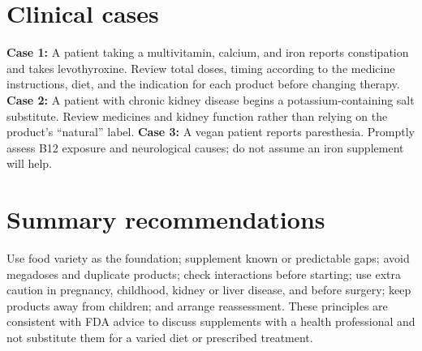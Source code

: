 \section{Clinical cases}
\textbf{Case 1:} A patient taking a multivitamin, calcium, and iron reports constipation and takes levothyroxine. Review total doses, timing according to the medicine instructions, diet, and the indication for each product before changing therapy. \textbf{Case 2:} A patient with chronic kidney disease begins a potassium-containing salt substitute. Review medicines and kidney function rather than relying on the product's ``natural'' label. \textbf{Case 3:} A vegan patient reports paresthesia. Promptly assess B12 exposure and neurological causes; do not assume an iron supplement will help. \cite{odsCa,odsIron,napElectrolytes,odsB12}

\section{Summary recommendations}
Use food variety as the foundation; supplement known or predictable gaps; avoid megadoses and duplicate products; check interactions before starting; use extra caution in pregnancy, childhood, kidney or liver disease, and before surgery; keep products away from children; and arrange reassessment. These principles are consistent with FDA advice to discuss supplements with a health professional and not substitute them for a varied diet or prescribed treatment. \cite{fdaSupplements}
